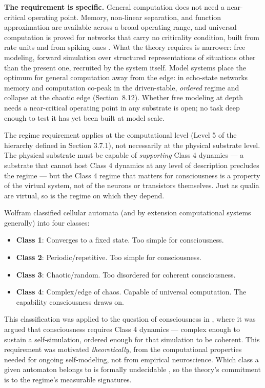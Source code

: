 \documentclass[12pt]{article}
\begin{document}
\textbf{The requirement is specific.} General computation does not need a near-critical operating point. Memory, non-linear separation, and function approximation are available across a broad operating range, and universal computation is proved for networks that carry no criticality condition, built from rate units \citep{SiegelmannSontag1995} and from spiking ones \citep{Maass1996}. What the theory requires is narrower: free modeling, forward simulation over structured representations of situations other than the present one, recruited by the system itself. Model systems place the optimum for general computation away from the edge: in echo-state networks memory and computation co-peak in the driven-stable, \emph{ordered} regime and collapse at the chaotic edge (Section~8.12). Whether free modeling at depth needs a near-critical operating point in any substrate is open; no task deep enough to test it has yet been built at model scale.

The regime requirement applies at the computational level (Level 5 of the hierarchy defined in Section 3.7.1), not necessarily at the physical substrate level. The physical substrate must be capable of \emph{supporting} Class 4 dynamics --- a substrate that cannot host Class 4 dynamics at any level of description precludes the regime --- but the Class 4 regime that matters for consciousness is a property of the virtual system, not of the neurons or transistors themselves. Just as qualia are virtual, so is the regime on which they depend.

Wolfram classified cellular automata (and by extension computational systems generally) into four classes:
\begin{itemize}
\item \textbf{Class 1}: Converges to a fixed state. Too simple for consciousness.
\item \textbf{Class 2}: Periodic/repetitive. Too simple for consciousness.
\item \textbf{Class 3}: Chaotic/random. Too disordered for coherent consciousness.
\item \textbf{Class 4}: Complex/edge of chaos. Capable of universal computation. The capability consciousness draws on.
\end{itemize}

This classification was applied to the question of consciousness in \citet{Gruber2015}, where it was argued that consciousness requires Class 4 dynamics --- complex enough to sustain a self-simulation, ordered enough for that simulation to be coherent. This requirement was motivated \emph{theoretically}, from the computational properties needed for ongoing self-modeling, not from empirical neuroscience. Which class a given automaton belongs to is formally undecidable \citep{CulikYu1988}, so the theory's commitment is to the regime's measurable signatures.
\end{document}
